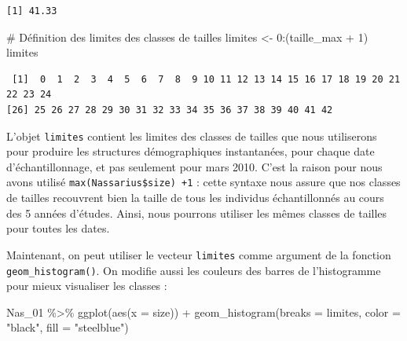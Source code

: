 \documentclass[
  a4paper,
  DIV=11,
  numbers=noendperiod,
  oneside]{scrreprt}
\newenvironment{Shaded}{}{}
\newcommand{\AttributeTok}[1]{\textcolor[rgb]{0.84,0.23,0.29}{#1}}
\newcommand{\CommentTok}[1]{\textcolor[rgb]{0.42,0.45,0.49}{#1}}
\newcommand{\DecValTok}[1]{\textcolor[rgb]{0.00,0.36,0.77}{#1}}
\newcommand{\FunctionTok}[1]{\textcolor[rgb]{0.44,0.26,0.76}{#1}}
\newcommand{\NormalTok}[1]{\textcolor[rgb]{0.14,0.16,0.18}{#1}}
\newcommand{\OtherTok}[1]{\textcolor[rgb]{0.44,0.26,0.76}{#1}}
\newcommand{\SpecialCharTok}[1]{\textcolor[rgb]{0.00,0.36,0.77}{#1}}
\newcommand{\StringTok}[1]{\textcolor[rgb]{0.01,0.18,0.38}{#1}}
\begin{document}
\begin{verbatim}
[1] 41.33
\end{verbatim}


\begin{Shaded}
\begin{Highlighting}[]
\CommentTok{\# Définition des limites des classes de tailles}
\NormalTok{limites }\OtherTok{\textless{}{-}} \DecValTok{0}\SpecialCharTok{:}\NormalTok{(taille\_max }\SpecialCharTok{+} \DecValTok{1}\NormalTok{)}
\NormalTok{limites}
\end{Highlighting}
\end{Shaded}

\begin{verbatim}
 [1]  0  1  2  3  4  5  6  7  8  9 10 11 12 13 14 15 16 17 18 19 20 21 22 23 24
[26] 25 26 27 28 29 30 31 32 33 34 35 36 37 38 39 40 41 42
\end{verbatim}


L'objet \texttt{limites} contient les limites des classes de tailles que
nous utiliserons pour produire les structures démographiques
instantanées, pour chaque date d'échantillonnage, et pas seulement pour
mars 2010. C'est la raison pour nous avons utilisé
\texttt{max(Nassarius\$size)\ +1} : cette syntaxe nous assure que nos
classes de tailles recouvrent bien la taille de tous les individus
échantillonnés au cours des 5 années d'études. Ainsi, nous pourrons
utiliser les mêmes classes de tailles pour toutes les dates.

Maintenant, on peut utiliser le vecteur \texttt{limites} comme argument
de la fonction \texttt{geom\_histogram()}. On modifie aussi les couleurs
des barres de l'histogramme pour mieux visualiser les classes :

\begin{Shaded}
\begin{Highlighting}[]
\NormalTok{Nas\_01 }\SpecialCharTok{\%\textgreater{}\%}
  \FunctionTok{ggplot}\NormalTok{(}\FunctionTok{aes}\NormalTok{(}\AttributeTok{x =}\NormalTok{ size)) }\SpecialCharTok{+}
  \FunctionTok{geom\_histogram}\NormalTok{(}\AttributeTok{breaks =}\NormalTok{ limites, }\AttributeTok{color =} \StringTok{"black"}\NormalTok{, }\AttributeTok{fill =} \StringTok{"steelblue"}\NormalTok{)}
\end{Highlighting}
\end{Shaded}
\end{document}
